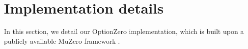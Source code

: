 
\clearpage


\section{Implementation details}
\label{appendix:implementation}

In this section, we detail our OptionZero implementation, which is built upon a publicly available MuZero framework \cite{wu_minizero_2024}.

